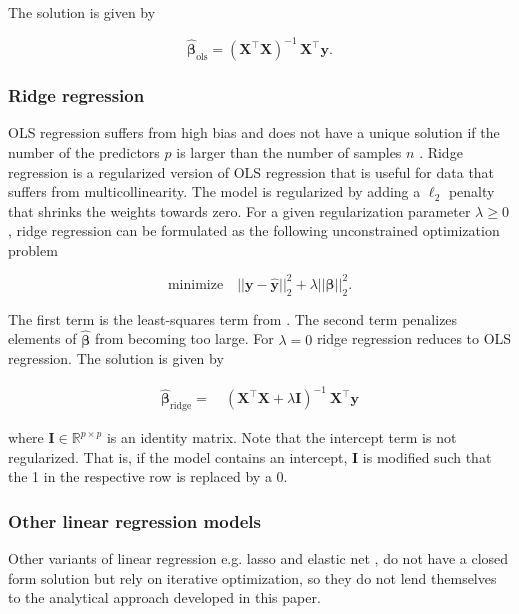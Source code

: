\documentclass[utf8]{frontiersSCNS} %
\renewcommand{\b}{\boldsymbol{\beta}} %
\newcommand{\bh}{\boldsymbol{\hat{\beta}}} %
\newcommand{\bOLS}{\boldsymbol{\hat{\beta}}_\text{ols}}
\newcommand{\I}{\mathbf{I}}
\newcommand{\R}{\mathbb{R}}
\newcommand{\X}{\mathbf{X}}
\newcommand{\y}{\mathbf{y}}
\newcommand{\yh}{\mathbf{\hat{y}}}
\begin{document}
 The solution is given by 
 
 \begin{equation}\label{eq:ols_solution}
 \bOLS =(\X^\top\X)^{-1}\,\X^\top\y.
 \end{equation}

\subsubsection{Ridge regression}

OLS regression suffers from high bias and does not have a unique solution if the number of the predictors $p$ is larger than the number of samples $n$ \citep{Marquardt1975RidgePractice,vanWieringen2015LectureRegression}. Ridge regression is a regularized version of OLS regression that is useful for data that suffers from multicollinearity. The model is regularized by adding a $\ell_2$ penalty that shrinks the weights towards zero. For a given regularization parameter $\lambda\ge0$, ridge regression can be formulated as the following unconstrained optimization problem

\begin{equation*}
\text{minimize}\quad ||\y-\yh||_2^2 + \lambda ||\b||_2^2.
\end{equation*}

The first term is the least-squares term from . The second term penalizes elements of $\bh$ from becoming too large. For $\lambda=0$ ridge regression reduces to OLS regression. The solution is given by

\begin{align}
\label{eq:ridge_solution}
\bh_\text{ridge} =\ & (\X^\top\X + \lambda\I)^{-1}\ \X^\top\y 
\end{align}

where $\I\in\R^{p\times p}$ is an identity matrix.  Note that the intercept term is not regularized. That is, if the model contains an intercept, $\I$ is modified such that the 1 in the respective row is replaced by a 0.


\subsubsection{Other linear regression models}

Other variants of linear regression e.g. lasso \citep{Tibshirani1996RegressionLasso} and elastic net \citep{Zou2005RegularizationNet}, do not have a closed form solution but rely on iterative optimization, so they do not lend themselves to the analytical approach developed in this paper.
\end{document}
